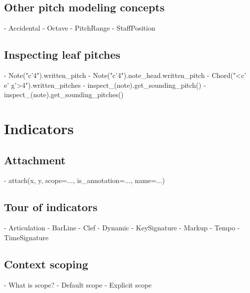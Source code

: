 \subsection{Other pitch modeling concepts}

\begin{markdown}
-   Accidental
-   Octave
-   PitchRange
-   StaffPosition
\end{markdown}

\subsection{Inspecting leaf pitches}

\begin{markdown}
-   Note("c'4").written_pitch
-   Note("c'4").note_head.written_pitch
-   Chord("<c' e' g'>4").written_pitches
-   inspect_(note).get_sounding_pitch()
-   inspect_(note).get_sounding_pitches()
\end{markdown}

\section{Indicators}

\subsection{Attachment}

\begin{markdown}
-   attach(x, y, scope=..., is_annotation=..., name=...)
\end{markdown}

\subsection{Tour of indicators}

\begin{markdown}
-   Articulation
-   BarLine
-   Clef 
-   Dynamic
-   KeySignature
-   Markup
-   Tempo
-   TimeSignature
\end{markdown}

\subsection{Context scoping}

\begin{markdown}
-   What is scope?
-   Default scope
-   Explicit scope
\end{markdown}

